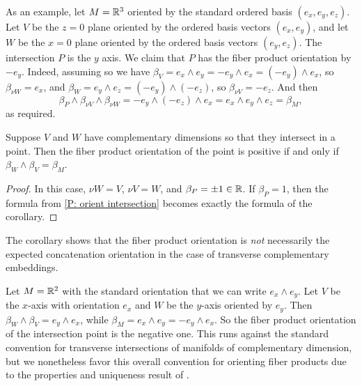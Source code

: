 \begin{example}\label{Ex: intersection orientation}
	As an example, let $M = \mathbb{R}^3$ oriented by the standard ordered basis $(e_x,e_y,e_z)$.
	Let $V$ be the $z = 0$ plane oriented by the ordered basis vectors $(e_x,e_y)$, and let $W$ be the $x = 0$ plane oriented by the ordered basis vectors $(e_y,e_z)$.
	The intersection $P$ is the $y$ axis.
	We claim that $P$ has the fiber product orientation by $-e_y$.
	Indeed, assuming so we have $\beta_V = e_x \wedge e_y = -e_y \wedge e_x = (-e_y) \wedge e_x$, so $\beta_{\nu W} = e_x$, and $\beta_W = e_y \wedge e_z = (-e_y) \wedge (-e_z)$, so $\beta_{\nu V} = -e_z$.
	And then $$\beta_P \wedge \beta_{\nu V} \wedge \beta_{\nu W} = -e_y \wedge (-e_z) \wedge e_x = e_x \wedge e_y \wedge e_z = \beta_M,$$
	as required.
\end{example}

\begin{corollary}\label{C: orient complementary intersection}
	Suppose $V$ and $W$ have complementary dimensions so that they intersect in a point.
	Then the fiber product orientation of the point is positive if and only if $\beta_{W} \wedge \beta_{V} = \beta_M$.
\end{corollary}

\begin{proof}
	In this case, $\nu W = V$, $\nu V = W$, and $\beta_P = \pm 1 \in \mathbb{R}$.
	If $\beta_P = 1$, then the formula from \cref{P: orient intersection} becomes exactly the formula of the corollary.
\end{proof}

\begin{remark}
	The corollary shows that the fiber product orientation is \textit{not} necessarily the expected concatenation orientation in the case of transverse complementary embeddings.
\end{remark}

\begin{example}
	Let $M = \mathbb{R}^2$ with the standard orientation that we can write $e_x \wedge e_y$.
	Let $V$ be the $x$-axis with orientation $e_x$ and $W$ be the $y$-axis oriented by $e_y$.
	Then $\beta_W \wedge \beta_V = e_y \wedge e_x$, while $\beta_M = e_x \wedge e_y = -e_y \wedge e_x$.
	So the fiber product orientation of the intersection point is the negative one.
	This runs against the standard convention for transverse intersections of manifolds of complementary dimension, but we nonetheless favor this overall convention for orienting fiber products due to the properties and uniqueness result of \cite{RamBas09}.
\end{example}

